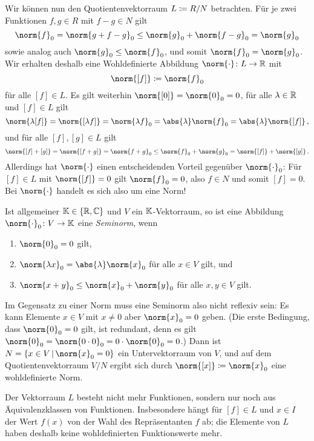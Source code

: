 Wir können nun den Quotientenvektorraum $L \coloneqq R/N$ betrachten.
Für je zwei Funktionen $f, g \in R$ mit $f - g \in N$ gilt
\[
        \norm{f}_0
  =     \norm{g + f-g}_0
  \leq  \norm{g}_0 + \norm{f-g}_0
  =     \norm{g}_0
\]
sowie analog auch $\norm{g}_0 \leq \norm{f}_0$, und somit $\norm{f}_0 = \norm{g}_0$.
Wir erhalten deshalb eine Wohldefinierte Abbildung $\norm{\cdot} \colon L \to \Real$ mit
\[
            \norm{[f]}
  \defined  \norm{f}_0
\]
für alle $[f] \in L$.
Es gilt weiterhin $\norm{[0]} = \norm{0}_0 = 0$, für alle $\lambda \in \mathbb{R}$ und $[f] \in L$ gilt
\[
    \norm{\lambda [f]}
  = \norm{[\lambda f]}
  = \norm{\lambda f}_0
  = \abs{\lambda} \norm{f}_0
  = \abs{\lambda} \norm{[f]} \,,
\]
und für alle $[f], [g] \in L$ gilt
\[
        \norm{[f] + [g]}
  =     \norm{[f + g]}
  =     \norm{f + g}_0
  \leq  \norm{f}_0 + \norm{g}_0
  =     \norm{[f]} + \norm{[g]} \,.
\]
Allerdings hat $\norm{\cdot}$ einen entscheidenden Vorteil gegenüber $\norm{\cdot}_0$:
Für $[f] \in L$ mit $\norm{[f]} = 0$ gilt $\norm{f}_0 = 0$, also $f \in N$ und somit $[f] = 0$.
Bei $\norm{\cdot}$ handelt es sich also um eine Norm!

\begin{remark}
  Ist allgemeiner $\mathbb{K} \in \{\mathbb{R}, \mathbb{C}\}$ und $V$ ein $\mathbb{K}$-Vektorraum, so ist eine Abbildung $\norm{\cdot}_0 \colon V \to \Korper$ eine \emph{Seminorm}, wenn
  \begin{enumerate}
    \item
      $\norm{0}_0 = 0$ gilt,
    \item
      $\norm{\lambda x}_0 = \abs{\lambda} \norm{x}_0$ für alle $x \in V$ gilt, und
    \item
      $\norm{x + y}_0 \leq \norm{x}_0 + \norm{y}_0$ für alle $x, y \in V$ gilt.
  \end{enumerate}
  Im Gegensatz zu einer Norm muss eine Seminorm also nicht reflexiv sein:
  Es kann Elemente $x \in V$ mit $x \neq 0$ aber $\norm{x}_0 = 0$ geben.
  (Die erste Bedingung, dass $\norm{0}_0 = 0$ gilt, ist redundant, denn es gilt $\norm{0}_0 = \norm{0 \cdot 0}_0 = 0 \cdot \norm{0}_0 = 0$.)
  Dann ist $N = \{x \in V \suchthat \norm{x}_0 = 0\}$ ein Untervektorraum von $V$, und auf dem Quotientenvektorraum $V/N$ ergibt sich durch $\norm{[x]} \defined \norm{x}_0$ eine wohldefinierte Norm.
\end{remark}

Der Vektorraum $L$ besteht nicht mehr Funktionen, sondern nur noch aus Äquivalenzklassen von Funktionen.
Insbesondere hängt für $[f] \in L$ und $x \in I$ der Wert $f(x)$ von der Wahl des Repräsentanten $f$ ab;
die Elemente von $L$ haben deshalb keine wohldefinierten Funktionswerte mehr.


